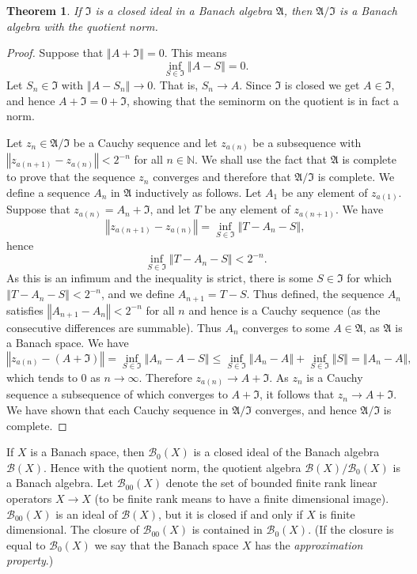 \documentclass{article}
\newcommand{\norm}[1]{\left\Vert #1 \right\Vert}
\newtheorem{theorem}{Theorem}
\theoremstyle{definition}
\begin{document}
\begin{theorem}
If $\mathfrak{I}$ is a closed ideal in a Banach algebra $\mathfrak{A}$, then
$\mathfrak{A} / \mathfrak{I}$ is a Banach algebra with the quotient norm.
\end{theorem}
\begin{proof}
Suppose that $\norm{A+\mathfrak{I}}=0$. This means
\[
\inf_{S \in \mathfrak{I}} \norm{A-S} = 0.
\]
Let $S_n \in \mathfrak{I}$ with $\norm{A-S_n} \to 0$. That is, $S_n \to A$. Since $\mathfrak{I}$ is closed we get $A \in \mathfrak{I}$, and hence
$A+\mathfrak{I} = 0 + \mathfrak{I}$, showing that the seminorm on the quotient is in fact a norm.

Let $z_n \in \mathfrak{A} / \mathfrak{I}$ be a Cauchy sequence and let $z_{a(n)}$ be a subsequence with $\norm{z_{a(n+1)}-z_{a(n)}}<2^{-n}$ for all $n \in \mathbb{N}$.
We shall use the fact that $\mathfrak{A}$ is complete to prove that the sequence $z_n$ converges
and therefore that $\mathfrak{A}/\mathfrak{I}$ is complete.
We define a sequence $A_n$ in $\mathfrak{A}$ inductively as follows.
Let $A_1$ be any element of $z_{a(1)}$. 
Suppose that $z_{a(n)}=A_n+\mathfrak{I}$, and let $T$ be any element of $z_{a(n+1)}$. We have
\[
\norm{z_{a(n+1)}-z_{a(n)}} = \inf_{S \in \mathfrak{I}} \norm{T-A_n-S},
\]
hence
\[
 \inf_{S \in \mathfrak{I}} \norm{T-A_n-S}<2^{-n}.
\]
As this is an infimum and the inequality is strict, there is some $S \in \mathfrak{I}$ for which $\norm{T-A_n-S}< 2^{-n}$, and we define $A_{n+1}=T-S$. Thus defined, the sequence $A_n$ satisfies
$\norm{A_{n+1}-A_n}<2^{-n}$ for all $n$ and hence is a Cauchy sequence (as the consecutive differences are summable). Thus $A_n$ converges to some $A \in
\mathfrak{A}$, as $\mathfrak{A}$ is a Banach space. We have
\[
\norm{z_{a(n)}-(A+\mathfrak{I})} = \inf_{S \in \mathfrak{I}} \norm{A_n-A-S} \leq \inf_{S \in \mathfrak{I}} \norm{A_n-A} + \inf_{S \in \mathfrak{I}} \norm{S}=
\norm{A_n-A},
\]
which tends to $0$ as $n \to \infty$. Therefore $z_{a(n)} \to A+\mathfrak{I}$. As $z_n$ is a Cauchy sequence a subsequence of which converges
to $A+\mathfrak{I}$, it follows that $z_n \to A+\mathfrak{I}$. We have shown that each Cauchy sequence in $\mathfrak{A}/\mathfrak{I}$ converges, and hence
$\mathfrak{A} / \mathfrak{I}$ is complete.
\end{proof}

If $X$ is a Banach space, then
 $\mathscr{B}_0(X)$ is a closed ideal of the Banach algebra $\mathscr{B}(X)$.
Hence with the quotient norm, the  quotient algebra $\mathscr{B}(X) / \mathscr{B}_0(X)$ is a Banach algebra.
Let $\mathscr{B}_{00}(X)$ denote the set of bounded finite rank linear operators $X \to X$ (to be finite rank means to have a finite dimensional image).
$\mathscr{B}_{00}(X)$ is an ideal of $\mathscr{B}(X)$, but it is closed if and only if $X$ is finite dimensional. The closure of $\mathscr{B}_{00}(X)$ is contained in 
$\mathscr{B}_0(X)$. (If the closure is equal to $\mathscr{B}_0(X)$ we say that the Banach space $X$ has the {\em approximation property}.)
\end{document}
